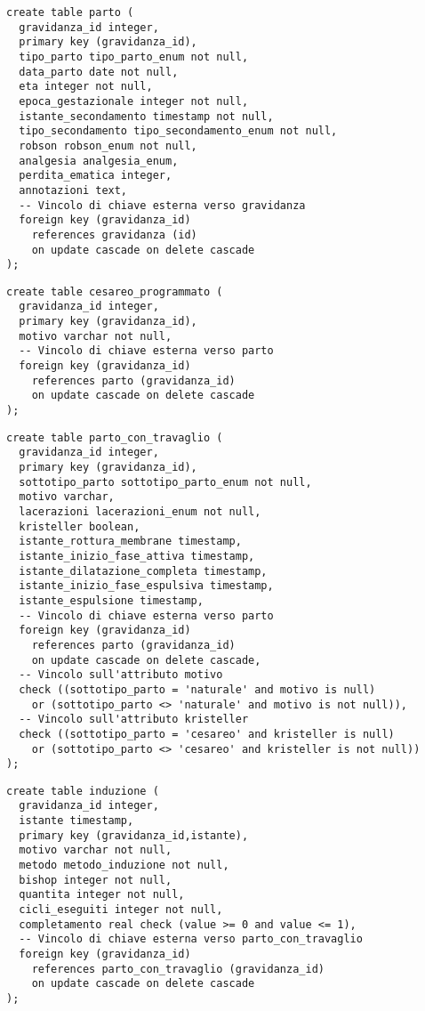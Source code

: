 \begin{lstlisting}[float,caption={Definizione della tabella \tab{parto}.},label=ptabparto]
create table parto (
  gravidanza_id integer,
  primary key (gravidanza_id),
  tipo_parto tipo_parto_enum not null,
  data_parto date not null,
  eta integer not null,
  epoca_gestazionale integer not null,
  istante_secondamento timestamp not null,
  tipo_secondamento tipo_secondamento_enum not null,
  robson robson_enum not null,
  analgesia analgesia_enum,
  perdita_ematica integer,
  annotazioni text,
  -- Vincolo di chiave esterna verso gravidanza
  foreign key (gravidanza_id)
    references gravidanza (id)
    on update cascade on delete cascade
);
\end{lstlisting}

\begin{lstlisting}[float,caption={Definizione della tabella \tab{cesareo\_programmato}.},label=ptabcesareoprogrammato]
create table cesareo_programmato (
  gravidanza_id integer,
  primary key (gravidanza_id),
  motivo varchar not null,
  -- Vincolo di chiave esterna verso parto
  foreign key (gravidanza_id)
    references parto (gravidanza_id)
    on update cascade on delete cascade
);
\end{lstlisting}

\begin{lstlisting}[float,caption={Definizione della tabella \tab{parto\_con\_travaglio}.},label=ptabpartocontravaglio]
create table parto_con_travaglio (
  gravidanza_id integer,
  primary key (gravidanza_id),
  sottotipo_parto sottotipo_parto_enum not null,
  motivo varchar,
  lacerazioni lacerazioni_enum not null,
  kristeller boolean,
  istante_rottura_membrane timestamp,
  istante_inizio_fase_attiva timestamp,
  istante_dilatazione_completa timestamp,
  istante_inizio_fase_espulsiva timestamp,
  istante_espulsione timestamp,
  -- Vincolo di chiave esterna verso parto
  foreign key (gravidanza_id)
    references parto (gravidanza_id)
    on update cascade on delete cascade,
  -- Vincolo sull'attributo motivo
  check ((sottotipo_parto = 'naturale' and motivo is null)
    or (sottotipo_parto <> 'naturale' and motivo is not null)),
  -- Vincolo sull'attributo kristeller
  check ((sottotipo_parto = 'cesareo' and kristeller is null)
    or (sottotipo_parto <> 'cesareo' and kristeller is not null))
);
\end{lstlisting}

\begin{lstlisting}[float,caption={Definizione della tabella \tab{induzione}.},label=ptabinduzione]
create table induzione (
  gravidanza_id integer,
  istante timestamp,
  primary key (gravidanza_id,istante),
  motivo varchar not null,
  metodo metodo_induzione not null,
  bishop integer not null,
  quantita integer not null,
  cicli_eseguiti integer not null,
  completamento real check (value >= 0 and value <= 1),
  -- Vincolo di chiave esterna verso parto_con_travaglio
  foreign key (gravidanza_id)
    references parto_con_travaglio (gravidanza_id)
    on update cascade on delete cascade
);
\end{lstlisting}


